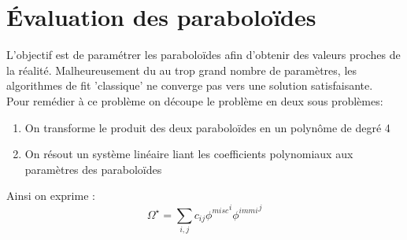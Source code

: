 \documentclass[a4paper,11pt,fleqn]{report}    %
\begin{document}
\section{Évaluation des paraboloïdes}

L'objectif est de paramétrer les paraboloïdes afin d'obtenir des valeurs proches de la réalité. Malheureusement du au trop grand nombre de paramètres, les algorithmes de fit 'classique' ne converge pas vers une solution satisfaisante. \\
Pour remédier à ce problème on découpe le problème en deux sous problèmes:
\begin{enumerate}
	\item On transforme le produit des deux paraboloïdes en un polynôme de degré 4 
	\item On résout un système linéaire liant les coefficients polynomiaux aux paramètres des paraboloïdes
\end{enumerate} 

Ainsi on exprime :
\begin{equation}
	\Omega^{\star} = \sum_{i,j} c_{ij}\left.\phi^{misc}\right.^i\left.\phi^{immi}\right.^j
\end{equation}




\newpage
\printbibliography
\end{document}
